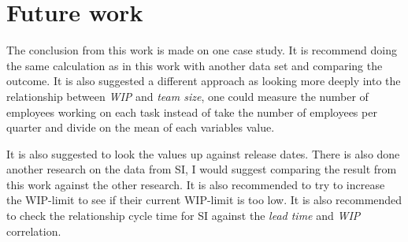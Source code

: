\documentclass[UKenglish]{ifimaster}  %
\begin{document}

\section{Future work}
The conclusion from this work is made on one case study. It is recommend doing the same calculation as in this work with another data set and comparing the outcome. It is also suggested a different approach as looking more deeply into the relationship between \textit{WIP} and  \textit{team size},  one could measure the number of employees working on each task instead of take the number of employees per quarter and divide on the mean of each variables value.

It is also suggested to look the values up against release dates. There is also done another research on the data from SI, I would suggest comparing the result from this work against the other research. It is also recommended to try to increase the WIP-limit to see if their current WIP-limit is too low. It is also recommended to check the relationship cycle time for SI against the \textit{lead time} and \textit{WIP} correlation.
\end{document}
